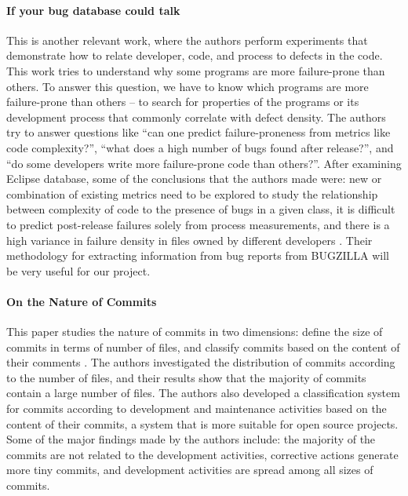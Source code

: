 {\paragraph{If your bug database could talk}
This is another relevant work, where the authors perform experiments
that demonstrate how to relate developer, code, and process to defects
in the code. This work tries to understand why some programs are more
failure-prone than others.  To answer this question, we have to know
which programs are more failure-prone than others – to search for
properties of the programs or its development process that commonly
correlate with defect density. The authors try to answer questions
like “can one predict failure-proneness from metrics like code
complexity?”, “what does a high number of bugs found after release?”,
and “do some developers write more failure-prone code than
others?”. After examining Eclipse database, some of the conclusions
that the authors made were: new or combination of existing metrics
need to be explored to study the relationship between complexity of
code to the presence of bugs in a given class, it is difficult to
predict post-release failures solely from process measurements, and
there is a high variance in failure density in files owned by
different developers \cite{2006-if}. Their methodology for extracting
information from bug reports from BUGZILLA will be very useful for our
project.

\paragraph{On the Nature of Commits}
This paper studies the nature of commits in two dimensions: define the
size of commits in terms of number of files, and classify commits
based on the content of their comments \cite{hattori2008nature}. The
authors investigated the distribution of commits according to the
number of files, and their results show that the majority of commits
contain a large number of files. The authors also developed a
classification system for commits according to development and
maintenance activities based on the content of their commits, a system
that is more suitable for open source projects. Some of the major
findings made by the authors include: the majority of the commits are
not related to the development activities, corrective actions generate
more tiny commits, and development activities are spread among all
sizes of commits.

}
